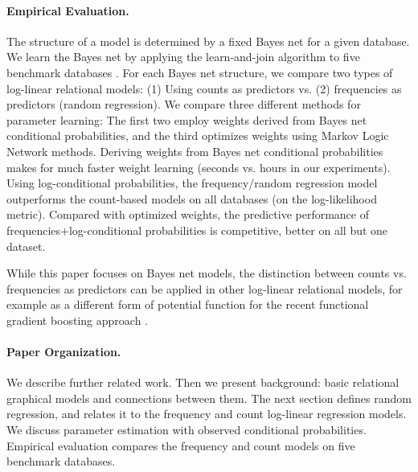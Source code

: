 \documentclass[twoside,leqno,twocolumn]{article}
\begin{document}
\paragraph{Empirical Evaluation.} The structure of a model is determined by a fixed Bayes net for a given database. We learn the Bayes net by applying the learn-and-join algorithm to five benchmark databases \cite{Schulte2012}.  For each Bayes net structure, we compare two types of log-linear relational models: (1) Using counts as predictors vs. (2) frequencies as predictors (random regression). We compare three different methods for parameter learning: The first two employ weights derived from Bayes net conditional probabilities, and the third optimizes weights using Markov Logic Network methods. 
%
Deriving weights from Bayes net conditional probabilities makes for much faster weight learning (seconds vs. hours in our experiments).
%
Using log-conditional probabilities, the frequency/random regression model outperforms the count-based models on all databases (on the log-likelihood metric). Compared with optimized weights, the predictive performance of frequencies+log-conditional probabilities is competitive, better on all but one dataset.

While this paper focuses on Bayes net models, the distinction between counts vs. frequencies as predictors can be applied  in other log-linear relational models, for example as a different form of potential function for the recent functional gradient boosting approach \cite{Natarajan2012,Khot2011}. 

\paragraph{Paper Organization.}
We describe further related work. Then we present background: basic relational graphical models and connections between them. The next section defines random regression, and relates it to the frequency and count log-linear regression models. We discuss parameter estimation with observed conditional probabilities.
Empirical evaluation compares the frequency and count models on five benchmark databases. 
\end{document}
